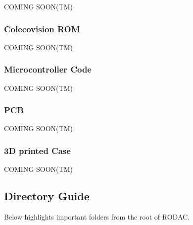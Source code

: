 \documentclass{article}
\begin{document}
  \par
  COMING SOON(TM)

  \subsubsection{Colecovision ROM}

  \par
  COMING SOON(TM)

  \subsubsection{Microcontroller Code}

  \par
  COMING SOON(TM)

  \subsubsection{PCB}

  \par
  COMING SOON(TM)

  \subsubsection{3D printed Case}

  \par
  COMING SOON(TM)

  \subsection{Directory Guide}

  \par
  Below highlights important folders from the root of RODAC.
\end{document}
